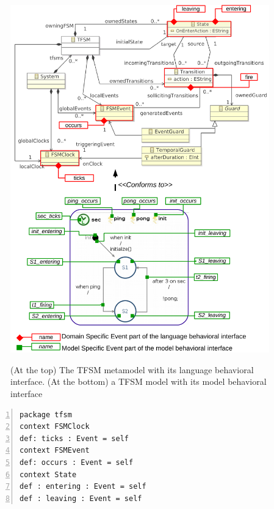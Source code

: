 \begin{figure}
	\begin{center}
		\includegraphics[width=1\textwidth]{bcool/figs/tfsmlang}
		\caption{(At the top) The TFSM metamodel with its language behavioral interface. (At the bottom)  a TFSM model with its model behavioral interface}
		\vspace{-2ex}
		\label{fig:tfsmmm}
	\end{center}
\end{figure}

\begin{lstlisting}[language=ecl,
caption={Partial \ecl specification of TFSM},
label={fig:tfsmmmecl}, 
basicstyle=\scriptsize\ttfamily, backgroundcolor=\color{LGrey}, numbers=left, xleftmargin=3pt]
package tfsm
context FSMClock
def: ticks : Event = self
context FSMEvent
def: occurs : Event = self
context State
def : entering : Event = self
def : leaving : Event = self
\end{lstlisting}

